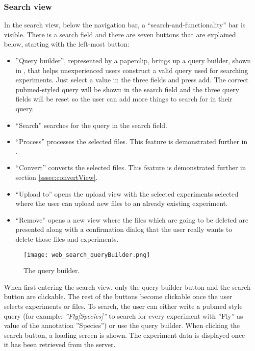 \subsubsection{Search view}

In the search view, below the navigation bar, a “search-and-functionality” bar is visible. There is a search field and there are seven buttons that are explained below, starting with the left-most button: 

\begin{itemize}
	\item ”Query builder”, represented by a paperclip, brings up a query builder, shown in , that helps unexperienced users construct a valid query used for searching experiments. Just select a value in the three fields and press add. The correct pubmed-styled query will be shown in the search field and the three query fields will be reset so the user can add more things to search for in their query.
	\item “Search” searches for the query in the search field. 
	\item “Process” processes the selected files. This feature is demonstrated further in .
    \item “Convert” converts the selected files. This feature is demonstrated further in section \ref{sssec:convertView}.
    \item “Upload to” opens the upload view with the selected experiments selected where the user can upload new files to an already existing experiment.
    \item “Remove” opens a new view where the files which are going to be deleted are presented along with a confirmation dialog that the user really wants to delete those files and experiments.
\end{itemize}

\begin{figure}[h]
\centering
\texttt{[image: web\_search\_queryBuilder.png]}
\caption{\label{fig:web_search_queryBuilder}The query builder.}
\end{figure}

When first entering the search view, only the query builder button and the search button are clickable. The rest of the buttons become clickable once the user selects experiments or files. To search, the user can either write a pubmed style query (for example: \textit{”Fly[Species]”} to search for every experiment with ”Fly” as value of the annotation ”Species”) or use the query builder. When clicking the search button, a loading screen is shown. The experiment data is displayed once it has been retrieved from the server.

